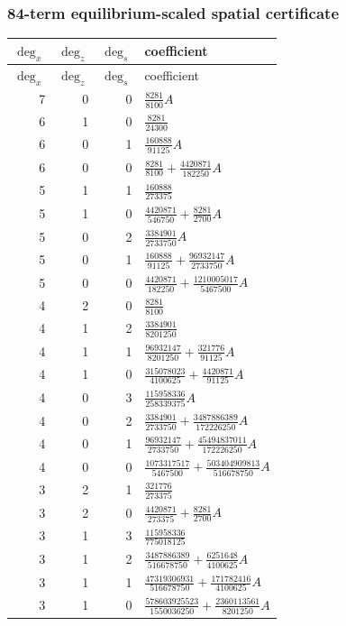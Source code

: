\subsubsection*{84-term equilibrium-scaled spatial certificate}
\begin{longtable}{rrrl}
$\deg_{x}$ & $\deg_{z}$ & $\deg_{s}$ & coefficient\\
\toprule
\endfirsthead
$\deg_{x}$ & $\deg_{z}$ & $\deg_{s}$ & coefficient\\
\toprule
\endhead
7 & 0 & 0 & $\frac{8281}{8100}A$\\
6 & 1 & 0 & $\frac{8281}{24300}$\\
6 & 0 & 1 & $\frac{160888}{91125}A$\\
6 & 0 & 0 & $\frac{8281}{8100}+\frac{4420871}{182250}A$\\
5 & 1 & 1 & $\frac{160888}{273375}$\\
5 & 1 & 0 & $\frac{4420871}{546750}+\frac{8281}{2700}A$\\
5 & 0 & 2 & $\frac{3384901}{2733750}A$\\
5 & 0 & 1 & $\frac{160888}{91125}+\frac{96932147}{2733750}A$\\
5 & 0 & 0 & $\frac{4420871}{182250}+\frac{1210005017}{5467500}A$\\
4 & 2 & 0 & $\frac{8281}{8100}$\\
4 & 1 & 2 & $\frac{3384901}{8201250}$\\
4 & 1 & 1 & $\frac{96932147}{8201250}+\frac{321776}{91125}A$\\
4 & 1 & 0 & $\frac{315078023}{4100625}+\frac{4420871}{91125}A$\\
4 & 0 & 3 & $\frac{115958336}{258339375}A$\\
4 & 0 & 2 & $\frac{3384901}{2733750}+\frac{3487886389}{172226250}A$\\
4 & 0 & 1 & $\frac{96932147}{2733750}+\frac{45494837011}{172226250}A$\\
4 & 0 & 0 & $\frac{1073317517}{5467500}+\frac{503404909813}{516678750}A$\\
3 & 2 & 1 & $\frac{321776}{273375}$\\
3 & 2 & 0 & $\frac{4420871}{273375}+\frac{8281}{2700}A$\\
3 & 1 & 3 & $\frac{115958336}{775018125}$\\
3 & 1 & 2 & $\frac{3487886389}{516678750}+\frac{6251648}{4100625}A$\\
3 & 1 & 1 & $\frac{47319306931}{516678750}+\frac{171782416}{4100625}A$\\
3 & 1 & 0 & $\frac{578603925523}{1550036250}+\frac{2360113561}{8201250}A$\\

\end{longtable}
